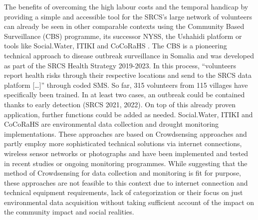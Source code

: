 The benefits of overcoming the high labour costs and the temporal handicap by providing a simple and accessible tool for the SRCS’s large network of volunteers can already be seen in other comparable contexts using the Community Based Surveillance (CBS) programme, its successor NYSS, the Ushahidi platform or tools like Social.Water, ITIKI and CoCoRaHS \autocite{fienenSocialWaterCrowdsourcing2012a} . The CBS is a pioneering technical approach to disease outbreak surveillance in Somalia and was developed as part of the SRCS Health Strategy 2019-2023. In this process, “volunteers report health risks through their respective locations and send to the SRCS data platform […]” \autocite[57]{somaliredcrescentsocietyFeasibilityStudyPotential2022} through coded SMS. So far, 315 volunteers from 115 villages have specifically been trained. In at least two cases, an outbreak could be contained thanks to early detection (SRCS 2021, 2022). On top of this already proven application, further functions could be added as needed.
Social.Water, ITIKI and CoCoRaHS are environmental data collection and drought monitoring implementations. These approaches are based on Crowdsensing approaches and partly employ more sophisticated technical solutions via internet connections, wireless sensor networks or photographs and have been implemented and tested in recent studies or ongoing monitoring programmes. While suggesting that the method of Crowdsensing for data collection and monitoring is fit for purpose, these approaches are not feasible to this context due to internet connection and technical equipment requirements, lack of categorization or their focus on just environmental data acquisition without taking sufficient account of the impact on the community impact and social realities.

